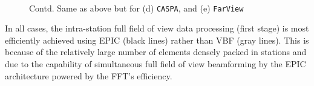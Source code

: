 \documentclass[
  journal=pasa,
  manuscript=article-type,
  year=2020,
  volume=37,
]{cup-journal}
\begin{document}
\begin{figure}\ContinuedFloat
{} \\
\caption{Contd. Same as above but for (d) \texttt{CASPA}, and (e) \texttt{FarView} \label{fig:1D-coherent-compcost-b}}
\end{figure}

In all cases, the intra-station full field of view data processing (first stage) is most efficiently achieved using EPIC (black lines) rather than VBF (gray lines). This is because of the relatively large number of elements densely packed in stations and due to the capability of simultaneous full field of view beamforming by the EPIC architecture powered by the FFT's efficiency. 
\end{document}
